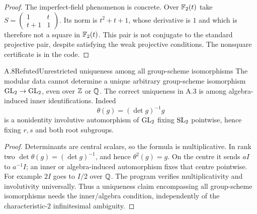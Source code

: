 \begin{proof}
The imperfect-field phenomenon is concrete. Over $\mathbb F_2(t)$ take
$S=\left(\begin{smallmatrix}1&t\\t+1&1\end{smallmatrix}\right)$.
Its norm is $t^2+t+1$, whose derivative is $1$ and which is
therefore not a square in $\mathbb F_2(t)$. This pair is not conjugate
to the standard projective pair, despite satisfying the weak
projective conditions. The nonsquare certificate is in the code.
\end{proof}

\begin{statement}{A.8}{Refuted}{Unrestricted uniqueness among all group-scheme isomorphisms}
The modular data cannot determine a unique arbitrary group-scheme
isomorphism $\operatorname{GL}_2\to\operatorname{GL}_2$, even over $\mathbb Z$ or $\mathbb Q$.
The correct uniqueness in A.3 is among algebra-induced inner
identifications. Indeed
\[
 \theta(g)=(\det g)^{-1}g
\]
is a nonidentity involutive automorphism of $\operatorname{GL}_2$ fixing
$\operatorname{SL}_2$ pointwise, hence fixing $r,s$ and both root subgroups.
\end{statement}
\begin{proof}
Determinants are central scalars, so the formula is multiplicative.
In rank two $\det\theta(g)=(\det g)^{-1}$, and hence $\theta^2(g)=g$.
On the centre it sends $aI$ to $a^{-1}I$; an inner or algebra-induced
automorphism fixes that centre pointwise. For example $2I$ goes
to $I/2$ over $\mathbb Q$. The program verifies multiplicativity and
involutivity universally. Thus a uniqueness claim encompassing
all group-scheme isomorphisms needs the inner/algebra condition,
independently of the characteristic-$2$ infinitesimal ambiguity.
\end{proof}

